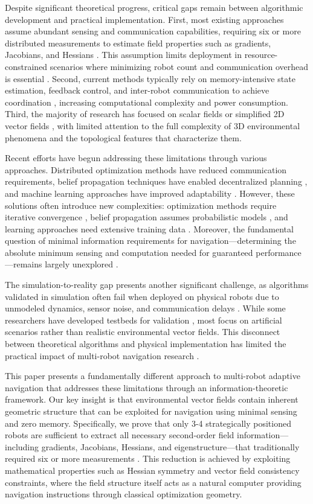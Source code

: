 \documentclass{article}
\begin{document}
Despite significant theoretical progress, critical gaps remain between algorithmic development and practical implementation. First, most existing approaches assume abundant sensing and communication capabilities, requiring six or more distributed measurements to estimate field properties such as gradients, Jacobians, and Hessians . This assumption limits deployment in resource-constrained scenarios where minimizing robot count and communication overhead is essential . Second, current methods typically rely on memory-intensive state estimation, feedback control, and inter-robot communication to achieve coordination , increasing computational complexity and power consumption. Third, the majority of research has focused on scalar fields or simplified 2D vector fields , with limited attention to the full complexity of 3D environmental phenomena and the topological features that characterize them.

Recent efforts have begun addressing these limitations through various approaches. Distributed optimization methods have reduced communication requirements, belief propagation techniques have enabled decentralized planning , and machine learning approaches have improved adaptability . However, these solutions often introduce new complexities: optimization methods require iterative convergence , belief propagation assumes probabilistic models , and learning approaches need extensive training data . Moreover, the fundamental question of minimal information requirements for navigation—determining the absolute minimum sensing and computation needed for guaranteed performance—remains largely unexplored .

The simulation-to-reality gap presents another significant challenge, as algorithms validated in simulation often fail when deployed on physical robots due to unmodeled dynamics, sensor noise, and communication delays . While some researchers have developed testbeds for validation , most focus on artificial scenarios rather than realistic environmental vector fields. This disconnect between theoretical algorithms and physical implementation has limited the practical impact of multi-robot navigation research .

This paper presents a fundamentally different approach to multi-robot adaptive navigation that addresses these limitations through an information-theoretic framework. Our key insight is that environmental vector fields contain inherent geometric structure that can be exploited for navigation using minimal sensing and zero memory. Specifically, we prove that only 3-4 strategically positioned robots are sufficient to extract all necessary second-order field information—including gradients, Jacobians, Hessians, and eigenstructure—that traditionally required six or more measurements . This reduction is achieved by exploiting mathematical properties such as Hessian symmetry and vector field consistency constraints, where the field structure itself acts as a natural computer providing navigation instructions through classical optimization geometry.
\end{document}
